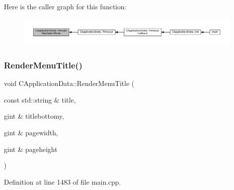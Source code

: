 Here is the caller graph for this function\+:\nopagebreak
\begin{figure}[H]
\begin{center}
\leavevmode
\includegraphics[width=350pt]{classCApplicationData_a72fff3a266be49b3e9f323dcfe545923_icgraph}
\end{center}
\end{figure}
\hypertarget{classCApplicationData_a548c5924a281c7e226fd7cac44e59920}{}\label{classCApplicationData_a548c5924a281c7e226fd7cac44e59920} 
\subsubsection{\texorpdfstring{Render\+Menu\+Title()}{RenderMenuTitle()}}
{\footnotesize\ttfamily void C\+Application\+Data\+::\+Render\+Menu\+Title (\begin{DoxyParamCaption}\item[{const std\+::string \&}]{title,  }\item[{gint \&}]{titlebottomy,  }\item[{gint \&}]{pagewidth,  }\item[{gint \&}]{pageheight }\end{DoxyParamCaption})\hspace{0.3cm}{\ttfamily [protected]}}



Definition at line 1483 of file main.\+cpp.


